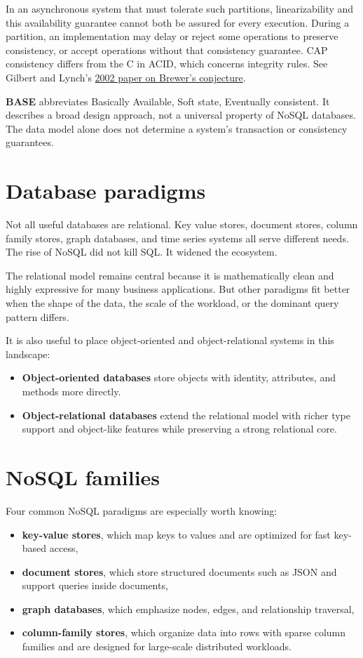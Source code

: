 \documentclass[11pt,a4paper,openany]{book}
\begin{document}
In an asynchronous system that must tolerate such partitions, linearizability and this availability guarantee cannot both be assured for every execution. During a partition, an implementation may delay or reject some operations to preserve consistency, or accept operations without that consistency guarantee. CAP consistency differs from the C in ACID, which concerns integrity rules. See Gilbert and Lynch's \href{https://doi.org/10.1145/564585.564601}{2002 paper on Brewer's conjecture}.

\textbf{BASE} abbreviates Basically Available, Soft state, Eventually consistent. It describes a broad design approach, not a universal property of NoSQL databases. The data model alone does not determine a system's transaction or consistency guarantees.

\section{Database paradigms}
Not all useful databases are relational. Key value stores, document stores, column family stores, graph databases, and time series systems all serve different needs. The rise of NoSQL did not kill SQL. It widened the ecosystem.

The relational model remains central because it is mathematically clean and highly expressive for many business applications. But other paradigms fit better when the shape of the data, the scale of the workload, or the dominant query pattern differs.

It is also useful to place object-oriented and object-relational systems in this landscape:
\begin{itemize}
\item \textbf{Object-oriented databases} store objects with identity, attributes, and methods more directly.
\item \textbf{Object-relational databases} extend the relational model with richer type support and object-like features while preserving a strong relational core.
\end{itemize}

\section{NoSQL families}
Four common NoSQL paradigms are especially worth knowing:
\begin{itemize}
\item \textbf{key-value stores}, which map keys to values and are optimized for fast key-based access,
\item \textbf{document stores}, which store structured documents such as JSON and support queries inside documents,
\item \textbf{graph databases}, which emphasize nodes, edges, and relationship traversal,
\item \textbf{column-family stores}, which organize data into rows with sparse column families and are designed for large-scale distributed workloads.
\end{itemize}
\end{document}
